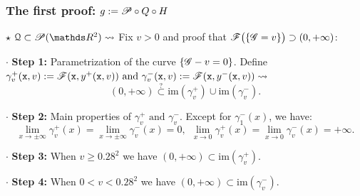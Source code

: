 \documentclass{beamer}
\begin{document}
\begin{frame}
\frametitle{The first proof: $g:=\P\circ Q\circ H$}
$\star$ $\Qu \subset \P(\R^2) \leadsto$ Fix $v>0$ and proof that $\F\big(\{\G=v\}\big) \supset(0,+\infty)$: 
\vspace{0.4cm}

$\cdot $ \textbf{Step 1:}  Parametrization of the curve $\{\G-v=0\}$. Define $\gamma_v^+(\x, v):=\F(\x,y^+(\x,v))\text{ and }\gamma_v^-(\x, v):=\F(\x,y^-(\x,v)) \leadsto$ \vspace{-0.1cm}
$$
(0,+\infty)\overset{?}{\subset}\text{im}(\gamma_v^+)\cup\text{im}(\gamma_v^-).
$$ 
\vspace{-0.4cm}

$\cdot $ \textbf{Step 2:}  Main properties of $\gamma_v^+ \text{ and } \gamma_v^-$. Except for $\gamma_1^-(x)$, we have: \vspace{-0.1cm}
$$
\lim_{x\rightarrow \pm\infty}\gamma_v^+(x)=\lim_{x\rightarrow \pm\infty}\gamma_v^-(x)=0,\ \ \lim_{x\rightarrow 0}\gamma_v^+(x)=\lim_{x\rightarrow 0}\gamma_v^-(x) = +\infty.
$$ 
\vspace{-0.3cm}

$\cdot $ \textbf{Step 3:} When $v\geq 0.28^2$ we have $(0,+\infty)\subset\text{im}(\gamma_v^+)$.  
\vspace{0.4cm}

$\cdot $ \textbf{Step 4:} When $0<v<0.28^2$ we have $(0,+\infty)\subset\text{im}(\gamma_v^-)$.

\end{frame}
\end{document}
